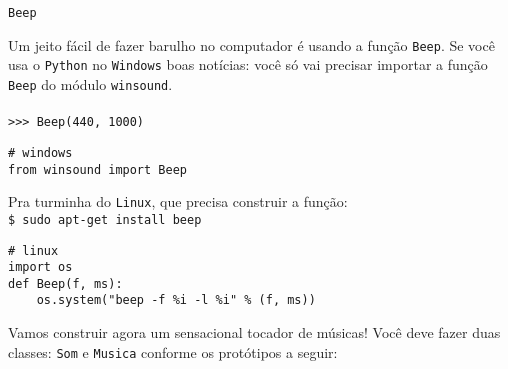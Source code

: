 \documentclass[12pt]{article}
\begin{document}
	\begin{interlude}{\texttt{Beep}}
	
	Um jeito fácil de fazer barulho no computador é usando a função \texttt{Beep}. Se você usa o \texttt{Python} no \texttt{Windows} boas notícias: você só vai precisar importar a função \texttt{Beep} do módulo \texttt{winsound}.\\
	\\
	\texttt{>>> Beep(440, 1000)}
	\begin{lstlisting}
# windows
from winsound import Beep
	\end{lstlisting}
	Pra turminha do \texttt{Linux}, que precisa construir a função: \\
	\texttt{\$ sudo apt-get install beep}
	\begin{lstlisting}
# linux
import os
def Beep(f, ms):
    os.system("beep -f %i -l %i" % (f, ms))
	\end{lstlisting}
	
	\end{interlude}
	
	Vamos construir agora um sensacional tocador de músicas! Você deve fazer duas classes: \texttt{Som} e \texttt{Musica} conforme os protótipos a seguir:
	
\end{document}
